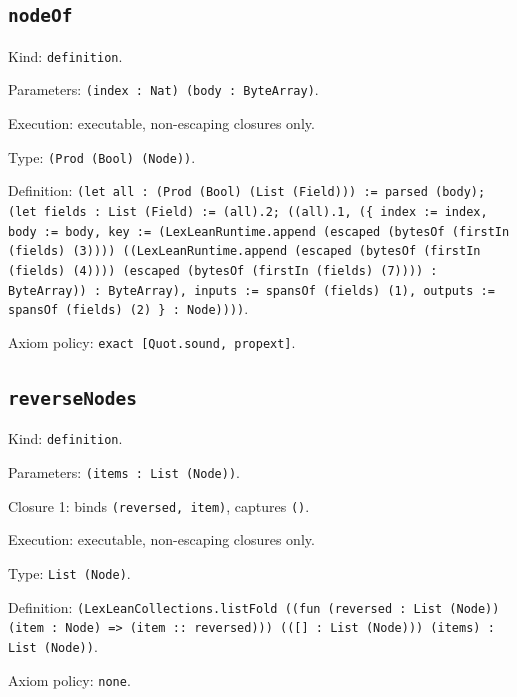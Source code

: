 \documentclass[11pt]{article}
\begin{document}
\subsection*{\texttt{nodeOf}}
\noindent Kind: \texttt{definition}.\par
\noindent Parameters: \texttt{(index : Nat) (body : ByteArray)}.\par
\noindent Execution: executable, non-escaping closures only.\par
\noindent Type: \texttt{(Prod (Bool) (Node))}.\par
\noindent Definition: \texttt{(let all : (Prod (Bool) (List (Field))) := parsed (body); (let fields : List (Field) := (all).2; ((all).1, (\{ index := index, body := body, key := (LexLeanRuntime.append (escaped (bytesOf (firstIn (fields) (3)))) ((LexLeanRuntime.append (escaped (bytesOf (firstIn (fields) (4)))) (escaped (bytesOf (firstIn (fields) (7)))) : ByteArray)) : ByteArray), inputs := spansOf (fields) (1), outputs := spansOf (fields) (2) \} : Node))))}.\par
\noindent Axiom policy: \texttt{exact [Quot.sound, propext]}.\par
\subsection*{\texttt{reverseNodes}}
\noindent Kind: \texttt{definition}.\par
\noindent Parameters: \texttt{(items : List (Node))}.\par
\noindent Closure 1: binds \texttt{(reversed, item)}, captures \texttt{()}.\par
\noindent Execution: executable, non-escaping closures only.\par
\noindent Type: \texttt{List (Node)}.\par
\noindent Definition: \texttt{(LexLeanCollections.listFold ((fun (reversed : List (Node)) (item : Node) => (item :: reversed))) (([] : List (Node))) (items) : List (Node))}.\par
\noindent Axiom policy: \texttt{none}.\par
\end{document}
